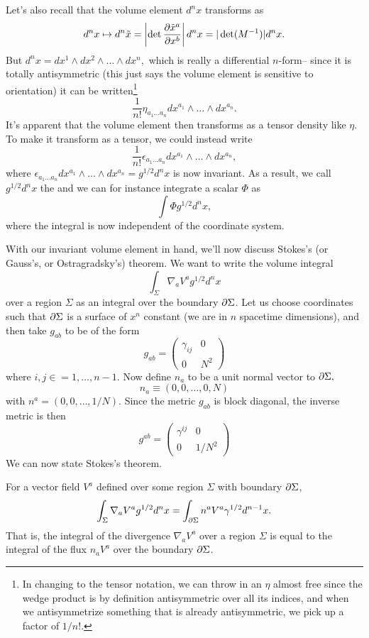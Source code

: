 Let's also recall that the volume element $d^n x$ transforms as
$$d^nx\mapsto d^n \tilde x =\left|\det \frac{\partial \tilde x^a}{\partial x^b}\right|d^n x =|\det (M^{-1})| d^n x.$$
But $d^nx=dx^1 \wedge dx^2 \wedge \ldots \wedge dx^n,$ which is really a differential $n$-form-- since it is totally antisymmetric (this just says the volume element is sensitive to orientation) it can be written\footnote{In changing to the tensor notation, we can throw in an $\eta$ almost free since the wedge product is by definition antisymmetric over all its indices, and when we antisymmetrize something that is already antisymmetric, we pick up a factor of $1/n!$.}
$$\frac{1}{n!}\eta_{a_1\ldots a_n}dx^{a_1}\wedge \ldots \wedge dx^{a_n}.$$
It's apparent that the volume element then transforms as a tensor density like $\eta$. To make it transform as a tensor, we could instead write
$$\frac{1}{n!}\epsilon_{a_1\ldots a_n} dx^{a_1}\wedge \ldots \wedge dx^{a_n},$$
where $\epsilon_{a_1\ldots a_n} dx^{a_1}\wedge \ldots \wedge dx^{a_n}=g^{1/2}d^nx$ is now invariant. As a result, we call $g^{1/2}d^n x$ the  and we can for instance integrate a scalar $\Phi$ as
$$\int \Phi g^{1/2} d^n x,$$
where the integral is now independent of the coordinate system.

With our invariant volume element in hand, we'll now discuss Stokes's (or Gauss's, or Ostragradsky's) theorem. We want to write the volume integral
$$\int_{\Sigma}\nabla_a V^a g^{1/2}d^n x$$
over a region $\Sigma$ as an integral over the boundary $\partial \Sigma$. Let us choose coordinates such that $\partial\Sigma$ is a surface of $x^n$ constant (we are in $n$ spacetime dimensions), and then take $g_{ab}$ to be of the form
$$g_{ab}=\begin{pmatrix}
\gamma_{ij}&0\\
0&N^2
\end{pmatrix}$$
where $i,j\in=1,\ldots,n-1.$
Now define $n_a$ to be a unit normal vector to $\partial\Sigma,$
$$n_a\equiv (0,0,\ldots, 0,N)$$ with $n^a=(0,0,\ldots,1/N)$. Since the metric $g_{ab}$ is block diagonal, the inverse metric is then
$$g^{ab}=\begin{pmatrix}
\gamma^{ij}&0\\
0&1/N^2
\end{pmatrix}$$
We can now state Stokes's theorem.

\begin{thm}
For a vector field $V^a$ defined over some region $\Sigma$ with boundary $\partial \Sigma$,
$$\int_\Sigma \nabla_a V^a g^{1/2} d^n x = \int_{\partial \Sigma} n^a V^a \gamma^{1/2} d^{n-1}x.$$
That is, the integral of the divergence $\nabla_a V^a$ over a region $\Sigma$ is equal to the integral of the flux $n_a V^a$ over the boundary $\partial \Sigma$.
\end{thm}

